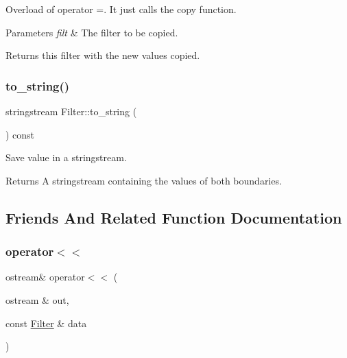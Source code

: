 Overload of operator =. It just calls the copy function. 


\begin{DoxyParams}{Parameters}
{\em filt} & The filter to be copied. \\
\hline
\end{DoxyParams}
\begin{DoxyReturn}{Returns}
this filter with the new values copied. 
\end{DoxyReturn}
\mbox{\label{class_filter_aba04694e9b16e23fb27f7ae730c9038f}} 
\subsubsection{\texorpdfstring{to\_string()}{to\_string()}}
{\footnotesize\ttfamily stringstream Filter\+::to\+\_\+string (\begin{DoxyParamCaption}{ }\end{DoxyParamCaption}) const\hspace{0.3cm}{\ttfamily [inline]}}



Save value in a stringstream. 

\begin{DoxyReturn}{Returns}
A stringstream containing the values of both boundaries. 
\end{DoxyReturn}


\subsection{Friends And Related Function Documentation}
\mbox{\label{class_filter_addf23b41f620f3518eeeb97b8bb2c2e1}} 
\subsubsection{\texorpdfstring{operator$<$$<$}{operator<<}}
{\footnotesize\ttfamily ostream\& operator$<$$<$ (\begin{DoxyParamCaption}\item[{ostream \&}]{out,  }\item[{const \mbox{\hyperlink{class_filter}{Filter}} \&}]{data }\end{DoxyParamCaption})\hspace{0.3cm}{\ttfamily [friend]}}

